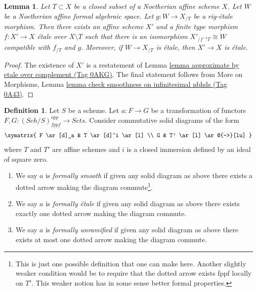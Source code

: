 \documentclass{amsart}
\theoremstyle{plain}
\newtheorem{lemma}[subsection]{Lemma}
\theoremstyle{definition}
\newtheorem{definition}[subsection]{Definition}
\theoremstyle{remark}
\numberwithin{equation}{subsection}
\def\Sch{\mathit{Sch}}
\begin{document}
\begin{lemma}
\label{restricted-lemma-algebraize-rig-etale-affine}
Let $T \subset X$ be a closed subset of a Noetherian affine scheme $X$.
Let $W$ be a Noetherian affine formal algebraic space.
Let $g : W \to X_{/T}$ be a rig-\'etale morphism. Then there exists
an affine scheme $X'$ and a finite type morphism $f : X' \to X$
\'etale over $X \setminus T$ such that there is an isomorphism
$X'_{/f^{-1}T} \cong W$ compatible with $f_{/T}$ and $g$.
Moreover, if $W \to X_{/T}$ is \'etale, then $X' \to X$ is \'etale.
\end{lemma}

\begin{proof}
The existence of $X'$ is a restatement of
Lemma \href{https://stacks.math.columbia.edu/tag/0AKG}{lemma approximate by etale over complement (Tag 0AKG)}.
The final statement follows from
More on Morphisms, Lemma
\href{https://stacks.math.columbia.edu/tag/0A43}{lemma check smoothness on infinitesimal nbhds (Tag 0A43)}.
\end{proof}


\begin{definition}
\label{spaces-more-morphisms-definition-formally-smooth-etale-unramified}
Let $S$ be a scheme.
Let $a : F \to G$ be a transformation of functors
$F, G : (\Sch/S)_{fppf}^{opp} \to \textit{Sets}$.
Consider commutative solid diagrams of the form
$$
\xymatrix{
F \ar[d]_a & T \ar[d]^i \ar[l] \\
G & T' \ar[l] \ar@{-->}[lu]
}
$$
where $T$ and $T'$ are affine schemes and $i$ is a closed immersion
defined by an ideal of square zero.
\begin{enumerate}
\item We say $a$ is {\it formally smooth} if given any solid
diagram as above there exists a dotted arrow making the diagram
commute\footnote{This is just one possible definition that one can
make here. Another slightly weaker condition would be to require that
the dotted arrow exists fppf locally on $T'$. This weaker notion
has in some sense better formal properties.}.
\item We say $a$ is {\it formally \'etale} if given any solid
diagram as above there exists exactly one dotted arrow making the diagram
commute.
\item We say $a$ is {\it formally unramified} if given any solid
diagram as above there exists at most one dotted arrow making the diagram
commute.
\end{enumerate}
\end{definition}
\end{document}
